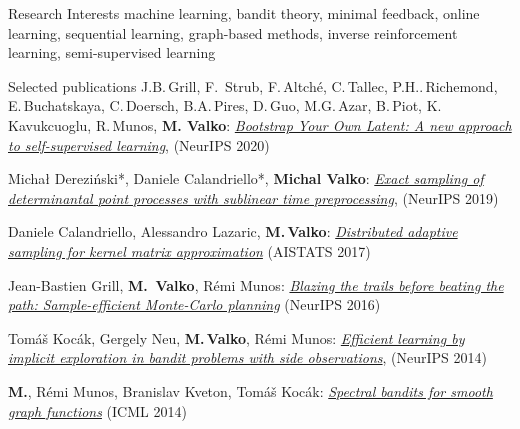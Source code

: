 \documentclass{resume}
\begin{document}
\vspace{-0.5cm}
\begin{category}{Research Interests}
\citemnobullet machine learning, bandit theory, minimal feedback, 
online learning, sequential learning, graph-based methods, inverse 
reinforcement learning, semi-supervised learning
\end{category}

\begin{category}{Selected publications}
\setlength\itemsep{0.1em}
\citembullet
J.B.\,Grill, F.\, Strub, F.\,Altch\' e, C.\,Tallec, P.H..\,Richemond, E.\,Buchatskaya, C.\,Doersch, B.A.\,Pires, D.\,Guo, M.G.\,Azar, B.\,Piot, K.\,Kavukcuoglu, R.\,Munos, {\bf M. Valko}:
\href{http://researchers.lille.inria.fr/~valko/hp/serve.php?what=publications/grill2020bootstrap}{\emph{Bootstrap Your Own Latent: A new approach to self-supervised learning}},
({\sf NeurIPS 2020}) 


\citembullet
Micha\l{} Derezi\'nski*, Daniele Calandriello*, {\bf Michal Valko}:
\href{http://researchers.lille.inria.fr/~valko/hp/serve.php?what=publications/derezinski2019exact.pdf}{\emph{Exact sampling of determinantal point processes with sublinear time preprocessing}},
({\sf NeurIPS 2019}) 


\citembullet
Daniele Calandriello, Alessandro Lazaric, {\bf M.\,Valko}:
\href{http://researchers.lille.inria.fr/~valko/hp/serve.php?what=publications/calandriello2017distributed.pdf}
{\emph{Distributed adaptive sampling for kernel matrix approximation}}
({\sf AISTATS 2017}) 

\citembullet
Jean-Bastien Grill, {\bf M.\, Valko}, R\' emi Munos:
\href{http://researchers.lille.inria.fr/~valko/hp/serve.php?what=publications/grill2016blazing.pdf}
{\emph{Blazing the trails before beating the path: Sample-efficient Monte-Carlo planning}}
({\sf NeurIPS 2016}) 

\citembullet
Tom\'a\v s Koc\' ak, Gergely Neu, {\bf M.\,Valko}, R\' emi Munos:  
\href{http://researchers.lille.inria.fr/~valko/hp/serve.php?what=publications/kocak2014efficient.pdf}
{\emph{Efficient learning by implicit exploration in bandit problems with side observations}}, 
 ({\sf NeurIPS 2014})


\citembullet
{\bf M.\@Valko}, R\' emi Munos, Branislav Kveton, Tom\'a\v s Koc\' ak:
\href{http://researchers.lille.inria.fr/~valko/hp/serve.php?what=publications/valko2014spectral.pdf}
{\emph{Spectral bandits for smooth graph functions}}
({\sf ICML 2014})  


\end{category}
\end{document}
